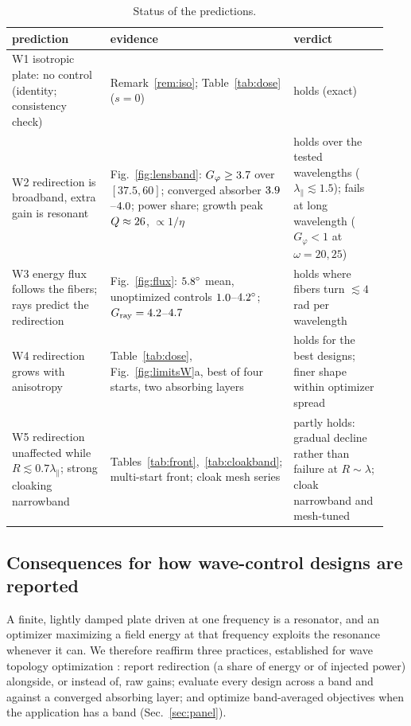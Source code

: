 \begin{table}[!htb]
\centering\footnotesize
\caption{Status of the predictions.}\label{tab:verdictW}
\begin{tabular}{@{}p{0.27\linewidth}p{0.41\linewidth}p{0.26\linewidth}@{}}
\toprule
prediction & evidence & verdict\\ \midrule
W1 isotropic plate: no control (identity; consistency check) & Remark~\ref{rem:iso}; Table~\ref{tab:dose} ($s=0$) & holds (exact)\\
W2 redirection is broadband, extra gain is resonant & Fig.~\ref{fig:lensband}: $G_\varphi\ge3.7$ over $[37.5,60]$; converged absorber $3.9$--$4.0$; power share; growth peak $Q\approx26$, $\propto1/\eta$ & holds over the tested wavelengths ($\lambda_\parallel\lesssim1.5$); fails at long wavelength ($G_\varphi<1$ at $\omega=20,25$)\\
W3 energy flux follows the fibers; rays predict the redirection & Fig.~\ref{fig:flux}: $5.8^\circ$ mean, unoptimized controls $1.0$--$4.2^\circ$; $G_{\rm ray}=4.2$--$4.7$ & holds where fibers turn $\lesssim4$\,rad per wavelength\\
W4 redirection grows with anisotropy & Table~\ref{tab:dose}, Fig.~\ref{fig:limitsW}a, best of four starts, two absorbing layers & holds for the best designs; finer shape within optimizer spread\\
W5 redirection unaffected while $R\lesssim0.7\lambda_\parallel$; strong cloaking narrowband & Tables~\ref{tab:front},~\ref{tab:cloakband}; multi-start front; cloak mesh series & partly holds: gradual decline rather than failure at $R\sim\lambda$; cloak narrowband and mesh-tuned\\
\bottomrule
\end{tabular}
\end{table}

\subsection{Consequences for how wave-control designs are reported}
A finite, lightly damped plate driven at one frequency is a resonator, and an optimizer maximizing a field
energy at that frequency exploits the resonance whenever it can. We therefore reaffirm three practices,
established for wave topology optimization \cite{jensen2005,andkjaer2013}: report redirection (a share of
energy or of injected power) alongside, or instead of, raw gains; evaluate every design across a band and
against a converged absorbing layer; and optimize band-averaged objectives when the application has a band
(Sec.~\ref{sec:panel}).

